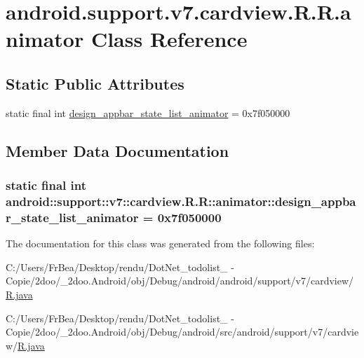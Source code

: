 \hypertarget{classandroid_1_1support_1_1v7_1_1cardview_1_1_r_1_1animator}{
\section{android.support.v7.cardview.R.R.animator Class Reference}
\label{classandroid_1_1support_1_1v7_1_1cardview_1_1_r_1_1animator}
}
\subsection*{Static Public Attributes}
\begin{CompactItemize}
\item 
static final int \hyperlink{classandroid_1_1support_1_1v7_1_1cardview_1_1_r_1_1animator_b5096b3463475401783adb4421a63a3b}{design\_\-appbar\_\-state\_\-list\_\-animator} = 0x7f050000
\end{CompactItemize}


\subsection{Member Data Documentation}
\hypertarget{classandroid_1_1support_1_1v7_1_1cardview_1_1_r_1_1animator_b5096b3463475401783adb4421a63a3b}{
\subsubsection[{design\_\-appbar\_\-state\_\-list\_\-animator}]{\setlength{\rightskip}{0pt plus 5cm}static final int android::support::v7::cardview.R.R::animator::design\_\-appbar\_\-state\_\-list\_\-animator = 0x7f050000}}
\label{classandroid_1_1support_1_1v7_1_1cardview_1_1_r_1_1animator_b5096b3463475401783adb4421a63a3b}




The documentation for this class was generated from the following files:\begin{CompactItemize}
\item 
C:/Users/FrBea/Desktop/rendu/DotNet\_\-todolist\_ - Copie/2doo/\_\-2doo.Android/obj/Debug/android/android/support/v7/cardview/\hyperlink{android_2support_2v7_2cardview_2_r_8java}{R.java}\item 
C:/Users/FrBea/Desktop/rendu/DotNet\_\-todolist\_ - Copie/2doo/\_\-2doo.Android/obj/Debug/android/src/android/support/v7/cardview/\hyperlink{src_2android_2support_2v7_2cardview_2_r_8java}{R.java}\end{CompactItemize}
